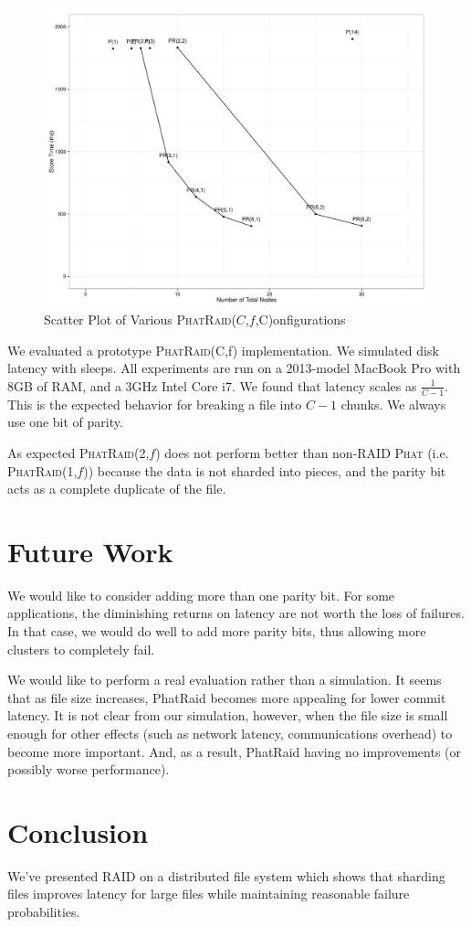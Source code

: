 \documentclass[10pt,letter]{article}
\newcommand{\phat}[0]{\textsc{Phat}}
\newcommand{\phatraidcf}[2]{\textsc{PhatRaid}(#1,#2)}
\begin{document}
\begin{figure}
  \includegraphics[scale=0.45]{Store.pdf}
  \caption{Scatter Plot of Various \phatraidcf{$C$,$f$} Configurations}
  \label{fig:plot}
\end{figure}

We evaluated a prototype \phatraidcf{C}{f} implementation. We simulated disk
latency with sleeps. All experiments are run on a 2013-model MacBook Pro with
8GB of RAM, and a 3GHz Intel Core i7. We found that latency scales as
$\frac{1}{C-1}$. This is the expected behavior for breaking a file into $C-1$
chunks. We always use one bit of parity.

As expected \phatraidcf{2}{$f$} does not perform better than non-RAID \phat{}
(i.e. \phatraidcf{1}{$f$}) because the data is not sharded into pieces, and the
parity bit acts as a complete duplicate of the file.

\section{Future Work}

We would like to consider adding more than one parity bit. For some
applications, the diminishing returns on latency are not worth the loss of
failures. In that case, we would do well to add more parity bits, thus allowing
more clusters to completely fail.

We would like to perform a real evaluation rather than a simulation. 
It seems that as file size increases, PhatRaid becomes more appealing 
for lower commit latency. It is not clear from our
simulation, however, when the file size is small enough for other effects (such as
network latency, communications overhead) to become more important. And, as a 
result, PhatRaid having no improvements (or possibly worse performance). 

\section{Conclusion}

We've presented RAID on a distributed file system which shows that sharding
files improves latency for large files while maintaining reasonable failure
probabilities.



\end{document}
